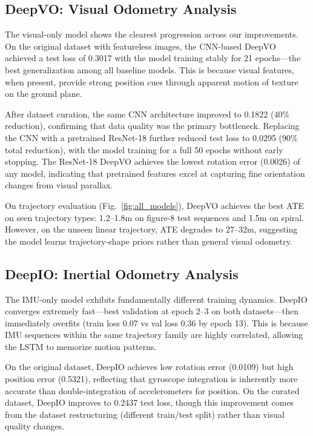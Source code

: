 \documentclass[conference]{IEEEtran}
\begin{document}
\subsection{DeepVO: Visual Odometry Analysis}

The visual-only model shows the clearest progression across our improvements. On the original dataset with featureless images, the CNN-based DeepVO achieved a test loss of 0.3017 with the model training stably for 21 epochs---the best generalization among all baseline models. This is because visual features, when present, provide strong position cues through apparent motion of texture on the ground plane.

After dataset curation, the same CNN architecture improved to 0.1822 (40\% reduction), confirming that data quality was the primary bottleneck. Replacing the CNN with a pretrained ResNet-18 further reduced test loss to 0.0295 (90\% total reduction), with the model training for a full 50 epochs without early stopping. The ResNet-18 DeepVO achieves the lowest rotation error (0.0026) of any model, indicating that pretrained features excel at capturing fine orientation changes from visual parallax.

On trajectory evaluation (Fig.~\ref{fig:all_models}), DeepVO achieves the best ATE on seen trajectory types: 1.2--1.8m on figure-8 test sequences and 1.5m on spiral. However, on the unseen linear trajectory, ATE degrades to 27--32m, suggesting the model learns trajectory-shape priors rather than general visual odometry.

\subsection{DeepIO: Inertial Odometry Analysis}

The IMU-only model exhibits fundamentally different training dynamics. DeepIO converges extremely fast---best validation at epoch 2--3 on both datasets---then immediately overfits (train loss 0.07 vs val loss 0.36 by epoch 13). This is because IMU sequences within the same trajectory family are highly correlated, allowing the LSTM to memorize motion patterns.

On the original dataset, DeepIO achieves low rotation error (0.0109) but high position error (0.5321), reflecting that gyroscope integration is inherently more accurate than double-integration of accelerometers for position. On the curated dataset, DeepIO improves to 0.2437 test loss, though this improvement comes from the dataset restructuring (different train/test split) rather than visual quality changes.
\end{document}
